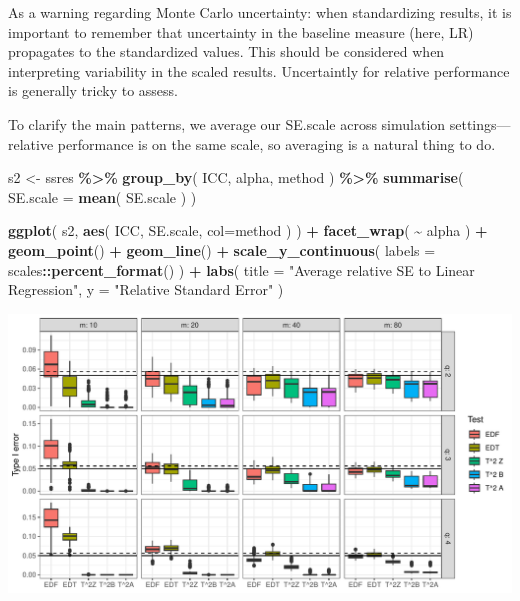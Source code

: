 \documentclass[
]{book}
\newenvironment{Shaded}{\begin{snugshade}}{\end{snugshade}}
\newcommand{\AttributeTok}[1]{\textcolor[rgb]{0.13,0.29,0.53}{#1}}
\newcommand{\FunctionTok}[1]{\textcolor[rgb]{0.13,0.29,0.53}{\textbf{#1}}}
\newcommand{\NormalTok}[1]{#1}
\newcommand{\OtherTok}[1]{\textcolor[rgb]{0.56,0.35,0.01}{#1}}
\newcommand{\SpecialCharTok}[1]{\textcolor[rgb]{0.81,0.36,0.00}{\textbf{#1}}}
\newcommand{\StringTok}[1]{\textcolor[rgb]{0.31,0.60,0.02}{#1}}
\begin{document}
As a warning regarding Monte Carlo uncertainty: when standardizing results, it is important to remember that uncertainty in the baseline measure (here, LR) propagates to the standardized values. This should be considered when interpreting variability in the scaled results.
Uncertaintly for relative performance is generally tricky to assess.

To clarify the main patterns, we average our SE.scale across simulation settings---relative performance is on the same scale, so averaging is a natural thing to do.

\begin{Shaded}
\begin{Highlighting}[]
\NormalTok{s2 }\OtherTok{\textless{}{-}} 
\NormalTok{  ssres }\SpecialCharTok{\%\textgreater{}\%} 
  \FunctionTok{group\_by}\NormalTok{( ICC, alpha, method ) }\SpecialCharTok{\%\textgreater{}\%}
  \FunctionTok{summarise}\NormalTok{( }\AttributeTok{SE.scale =} \FunctionTok{mean}\NormalTok{( SE.scale ) )}

\FunctionTok{ggplot}\NormalTok{( s2, }\FunctionTok{aes}\NormalTok{( ICC, SE.scale, }\AttributeTok{col=}\NormalTok{method ) ) }\SpecialCharTok{+}
  \FunctionTok{facet\_wrap}\NormalTok{( }\SpecialCharTok{\textasciitilde{}}\NormalTok{ alpha ) }\SpecialCharTok{+}
  \FunctionTok{geom\_point}\NormalTok{() }\SpecialCharTok{+} \FunctionTok{geom\_line}\NormalTok{() }\SpecialCharTok{+}
  \FunctionTok{scale\_y\_continuous}\NormalTok{( }\AttributeTok{labels =}\NormalTok{ scales}\SpecialCharTok{::}\FunctionTok{percent\_format}\NormalTok{() ) }\SpecialCharTok{+}
  \FunctionTok{labs}\NormalTok{( }\AttributeTok{title =} \StringTok{"Average relative SE to Linear Regression"}\NormalTok{,}
        \AttributeTok{y =} \StringTok{"Relative Standard Error"}\NormalTok{ )}
\end{Highlighting}
\end{Shaded}

\begin{center}\includegraphics[width=0.75\linewidth]{Designing-Simulations-in-R_files/figure-latex/unnamed-chunk-181-1} \end{center}
\end{document}
